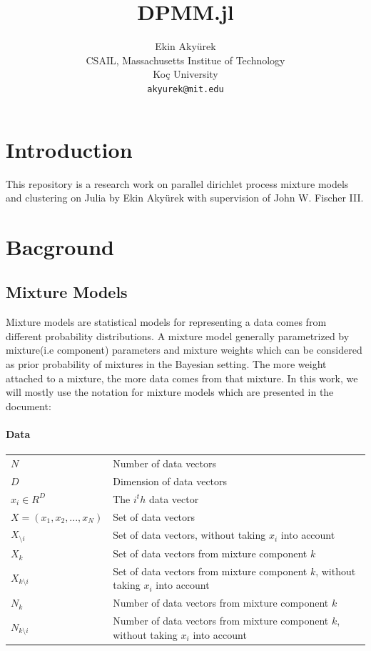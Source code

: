 \documentclass[a4paper]{article}
\title{DPMM.jl}
\author{
  Ekin Akyürek\\
   CSAIL, Massachusetts Institue of Technology\\
   Koç University\\
  \texttt{akyurek@mit.edu}
 }
\begin{document}
\maketitle

\section{Introduction}

This repository is a research work on parallel dirichlet process mixture
models and clustering on Julia by Ekin Akyürek with supervision of John
W. Fischer III.

\section{Bacground}

\subsection{Mixture Models}

Mixture models are statistical models for representing a data comes from
different probability distributions. A mixture model generally
parametrized by mixture(i.e component) parameters and mixture weights
which can be considered as prior probability of mixtures in the Bayesian
setting. The more weight attached to a mixture, the more data comes from
that mixture. In this work, we will mostly use the notation for mixture
models which are presented in the document\cite{kamper2013gibbs}:

\paragraph{Data}
\begin{center}
\begin{tabular}{|l|l|}
\hline
$N$ & Number of data vectors \\
$D$ & Dimension of data vectors \\
$x_i \in R^D$ & The $i^th$ data vector \\
$X = (x_1, x_2,...,x_N)$ & Set of data vectors \\
$X_{\setminus i}$ & Set of data vectors, without taking $x_i$ into account\\
$X_k$  & Set of data vectors from mixture component $k$ \\ 
$X_{k \setminus i}$  & Set of data vectors from mixture component $k$, without taking $x_i$ into account  \\
$N_k$ & Number of data vectors from mixture component $k$ \\  
$N_{k \setminus i}$ & Number of data vectors from mixture component $k$, without taking $x_i$ into account \\ \hline
\end{tabular}
\end{center}
\end{document}
